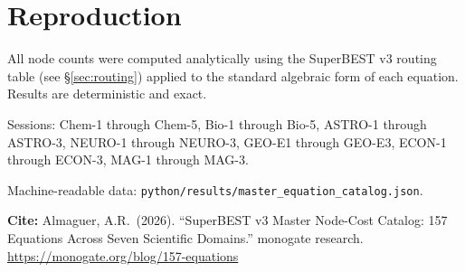 \documentclass[12pt,a4paper]{article}
\theoremstyle{definition}
\begin{document}
\section*{Reproduction}

All node counts were computed analytically using the SuperBEST v3 routing
table (see \S\ref{sec:routing}) applied to the standard algebraic form
of each equation.  Results are deterministic and exact.

Sessions: Chem-1 through Chem-5, Bio-1 through Bio-5,
ASTRO-1 through ASTRO-3, NEURO-1 through NEURO-3,
GEO-E1 through GEO-E3, ECON-1 through ECON-3, MAG-1 through MAG-3.

Machine-readable data: \texttt{python/results/master\_equation\_catalog.json}.

\vspace{12pt}
\noindent\textbf{Cite:} Almaguer, A.R.\ (2026).
``SuperBEST v3 Master Node-Cost Catalog: 157 Equations Across Seven
Scientific Domains.'' monogate research.
\url{https://monogate.org/blog/157-equations}
\end{document}
